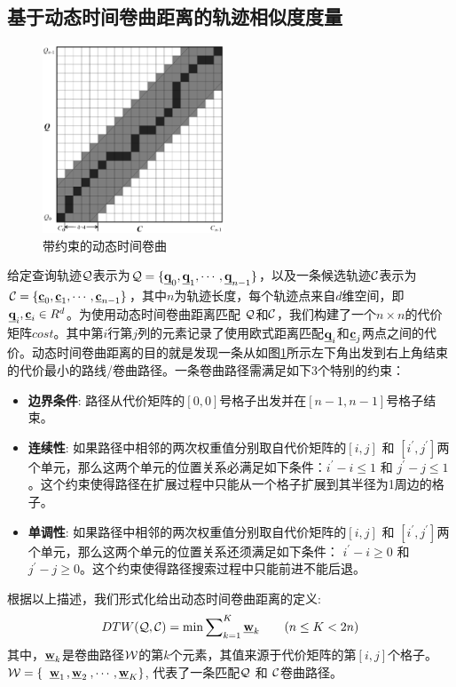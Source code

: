 \subsection{基于动态时间卷曲距离的轨迹相似度度量}\label{sec-c5-DTW}
\begin{figure}[t]
	\centering
	\includegraphics[width=0.48\textwidth]{Fig/chapter5/DTW}
	\caption{带约束的动态时间卷曲}
	\label{fig:DTW}
\end{figure}
给定查询轨迹$\cal Q$表示为${\cal Q}=\{\emph{{\textbf{q}}}_{0}, \emph{{\textbf{q}}}_{1}, \cdots, \emph{{\textbf{q}}}_{n-1}\}$，以及一条候选轨迹$\cal C$表示为${\cal C}=\{\emph{{\textbf{c}}}_{0}, \emph{{\textbf{c}}}_{1}, \cdots, \emph{{\textbf{c}}}_{n-1}\}$，其中$n$为轨迹长度，每个轨迹点来自$d$维空间，即$\emph{{\textbf{q}}}_{i},\emph{{\textbf{c}}}_{i} \in R^{d}$。为使用动态时间卷曲距离匹配 $\cal Q$和$\cal C$，我们构建了一个$n\times n$的代价矩阵$cost$。其中第$i$行第$j$列的元素记录了使用欧式距离匹配$\emph{{\textbf{q}}}_{i}$和$\emph{{\textbf{c}}}_{j}$两点之间的代价。动态时间卷曲距离的目的就是发现一条从如图\ref{fig:DTW}所示左下角出发到右上角结束的代价最小的路线/卷曲路径。一条卷曲路径需满足如下3个特别的约束：
\begin{itemize}
	\item \textbf{边界条件}: 路径从代价矩阵的$[0,0]$号格子出发并在$[n-1,n-1]$号格子结束。
	
	\item \textbf{连续性}: 如果路径中相邻的两次权重值分别取自代价矩阵的$[i,j]$ 和 $[i^{'},j^{'}]$两个单元，那么这两个单元的位置关系必满足如下条件：$i^{'}-i\le 1$ 和 $j^{'} - j \le 1$。这个约束使得路径在扩展过程中只能从一个格子扩展到其半径为1周边的格子。
	\item \textbf{单调性}: 如果路径中相邻的两次权重值分别取自代价矩阵的$[i,j]$ 和 $[i^{'},j^{'}]$两个单元，那么这两个单元的位置关系还须满足如下条件： $i^{'}-i\ge 0$ 和 $j^{'} - j \ge 0$。这个约束使得路径搜索过程中只能前进不能后退。
\end{itemize}
根据以上描述，我们形式化给出动态时间卷曲距离的定义:
\begin{eqnarray}\label{eq:dtwDef}
DTW({\cal Q}, {\cal C})= \min{\sum\nolimits_{k=1}^{K}\emph{{\textbf{w}}}_{k}} \qquad {(n\le K < 2n)}
\end{eqnarray}
其中，$\emph{{\textbf{w}}}_{k}$是卷曲路径$\cal W$的第$k$个元素，其值来源于代价矩阵的第$[i,j]$个格子。
$\cal{W}=\{$ $\emph{{\textbf{w}}}_{1}$$,\emph{{\textbf{w}}}_{2}$$,\cdots,\emph{{\textbf{w}}}_{K}\}$, 代表了一条匹配$\cal{Q}$ 和 $\cal{C}$卷曲路径。

